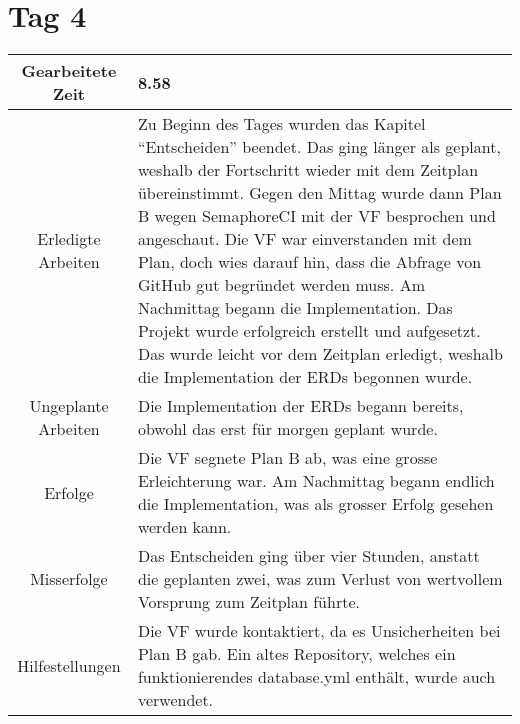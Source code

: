 \newpage

\section{Tag 4}
\begin{tabularx}{\textwidth}[H]{|c|X|}
  \hline
  Gearbeitete Zeit & 8.58 \\ \hline
  Erledigte Arbeiten & Zu Beginn des Tages wurden das Kapitel \enquote{Entscheiden} beendet. Das ging länger als geplant,
  weshalb der Fortschritt wieder mit dem Zeitplan übereinstimmt. \newline
  Gegen den Mittag wurde dann Plan B wegen SemaphoreCI mit der VF besprochen und angeschaut. Die VF war einverstanden mit 
  dem Plan, doch wies darauf hin, dass die Abfrage von GitHub gut begründet werden muss. \newline
  Am Nachmittag begann die Implementation. Das Projekt wurde erfolgreich erstellt und aufgesetzt. Das wurde leicht vor dem
  Zeitplan erledigt, weshalb die Implementation der ERDs begonnen wurde. \\ \hline
  Ungeplante Arbeiten & Die Implementation der ERDs begann bereits, obwohl das erst für morgen geplant wurde. \\ \hline
  Erfolge & Die VF segnete Plan B ab, was eine grosse Erleichterung war. Am Nachmittag begann endlich die Implementation,
  was als grosser Erfolg gesehen werden kann. \\ \hline
  Misserfolge & Das Entscheiden ging über vier Stunden, anstatt die geplanten zwei, was zum Verlust von wertvollem
  Vorsprung zum Zeitplan führte. \\ \hline
  Hilfestellungen & Die VF wurde kontaktiert, da es Unsicherheiten bei Plan B gab. Ein altes Repository, welches
  ein funktionierendes database.yml enthält, wurde auch verwendet. \\ \hline
\end{tabularx}

\newpage

